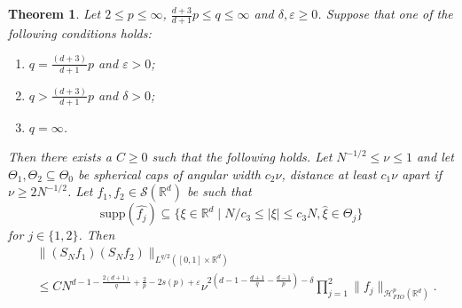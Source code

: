 \documentclass{amsart}
\numberwithin{equation}{section}
\newtheorem{theorem}{Theorem}[section]
\theoremstyle{definition}
\newcommand{\R}{\mathbb{R}}
\newcommand{\Rd}{\mathbb{R}^{d}}
\newcommand {\veps}{\varepsilon}
\newcommand {\Sw}{\mathcal{S}}
\newcommand {\supp}{\mathrm{supp}}
\newcommand {\wh}{\widehat}
\begin{document}
\begin{theorem}\label{thm:BilinearEstimates}
Let $2\leq p\leq \infty$, $\frac{d+3}{d+1}p\leq q\leq \infty$ and $\delta,\veps\geq0$. %
Suppose that one of the following conditions holds:
\begin{enumerate}
\item\label{it:bilinearmain1}  $q=\frac{(d+3)}{d+1}p$ and $\veps>0$;
\item\label{it:bilinearmain2} $q>\frac{(d+3)}{d+1}p$ and $\delta>0$;
\item\label{it:bilinearmain3} $q=\infty$.
\end{enumerate}
Then there exists a $C\geq0$ such that the following holds. Let $N^{-1/2}\leq \nu\leq 1$ and let $\Theta_{1},\Theta_{2}\subseteq \Theta_{0}$ be spherical caps of angular width $c_{2}\nu$, distance at least $c_{1}\nu$ apart if $\nu\geq 2N^{-1/2}$. 
Let
$f_{1},f_{2}\in\Sw(\Rd)$ be such that 
\begin{equation}\label{eq:bilinearassume}
\supp(\wh{f_{j}})\subseteq \{ \xi \in \R^d \mid N/c_{3}\leq |\xi|\leq c_{3}N, \hat{\xi}\in\Theta_{j}\}    
\end{equation}
for $j\in\{1,2\}$. Then 
\begin{equation}\label{eq:bilinearprove}
\begin{split}
&\|(S_{N}f_{1})(S_{N}f_{2})\|_{L^{q/2}([0,1] \times \R^d)}\\
&\leq C N^{d-1-\frac{2(d+1)}{q}+\frac{2}{p}-2s(p)+\veps} \nu^{2(d-1-\frac{d+1}{q}-\frac{d-1}{p})-\delta} \prod_{j=1}^2 \| f_{j} \|_{\mathcal{H}^{p}_{FIO}(\Rd)}.%
\end{split}
\end{equation}
\end{theorem}
\end{document}
